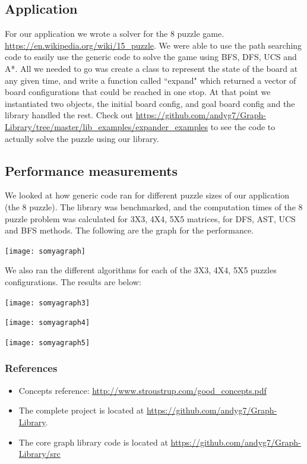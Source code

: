 \documentclass{article}
\begin{document}
\subsection{Application}
For our application we wrote a solver for the 8 puzzle game. \url{https://en.wikipedia.org/wiki/15_puzzle}. We were able to use the path searching code to easily use the generic code to solve the game using BFS, DFS, UCS and A*. All we needed to go was create a class to represent the state of the board at any given time, and write a function called ``expand" which returned a vector of board configurations that could be reached in one stop. At that point we instantiated two objects, the initial board config, and goal board config and the library handled the rest. Check out \url{https://github.com/andyg7/Graph-Library/tree/master/lib_examples/expander_examples} to see the code to actually solve the puzzle using our library.

\subsection{Performance measurements}
We looked at how generic code ran for different puzzle sizes of our application (the 8 puzzle). The library was benchmarked, and the computation times of the 8 puzzle problem was calculated for 3X3, 4X4, 5X5 matrices, for DFS, AST, UCS and BFS methods. The following are the graph for the performance.

\texttt{[image: somyagraph]}

We also ran the different algorithms for each of the 3X3, 4X4, 5X5 puzzles configurations. The results are below:

\texttt{[image: somyagraph3]}

\texttt{[image: somyagraph4]}

\texttt{[image: somyagraph5]}

\subsubsection{References}
\begin{itemize}
\item Concepts reference: \url{http://www.stroustrup.com/good_concepts.pdf}
\item The complete project is located at \url{https://github.com/andyg7/Graph-Library}.
\item The core graph library code is located at \url{https://github.com/andyg7/Graph-Library/src}
\end{itemize}
\end{document}
